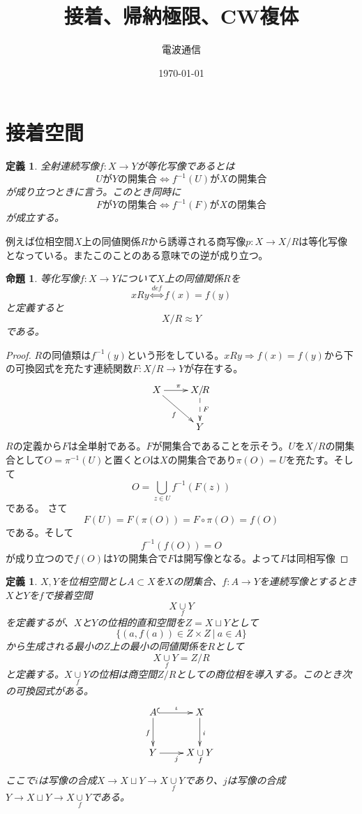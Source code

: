 \documentclass[leqno]{jsarticle}
\title{接着、帰納極限、CW複体}
\author{電波通信}
\date{\today}
\newtheorem{prop}[thm]{命題}
\newtheorem{df}[thm]{定義}
\newcommand{\To}{\Longrightarrow}
\newcommand{\qt}[2]{#1/\! #2}
\begin{document}
\maketitle
\section{接着空間}
\begin{df}
全射連続写像$f:X\to Y$が等化写像であるとは
\[
\mbox{$U$が$Y$の開集合}\iff\mbox{$f^{-1}(U)$が$X$の開集合}
\]
が成り立つときに言う。このとき同時に
\[
\mbox{$F$が$Y$の閉集合}\iff\mbox{$f^{-1}(F)$が$X$の閉集合}
\]
が成立する。
\end{df}
例えば位相空間$X$上の同値関係$R$から誘導される商写像$p:X\to \qt{X}{R}$は等化写像となっている。またこのことのある意味での逆が成り立つ。
\begin{prop}\label{syo}
等化写像$f:X\to Y$について$X$上の同値関係$R$を
\[
xRy\overset{def}{\iff}f(x)=f(y)
\]
と定義すると
\[
\qt{X}{R}\approx Y
\]
である。
\end{prop}
\begin{proof}$R$の同値類は$f^{-1}(y)$という形をしている。$xRy\To f(x)=f(y)$から下の可換図式を充たす連続関数$F:\qt{X}{R}\to Y$が存在する。
\[\xymatrix{
& X\ar@{->}[r]^{\pi} \ar@{->}[rd]_f& \qt{X}{R}\ar@{-->}[d]^F&\\ 
&  & Y&
}\]
$R$の定義から$F$は全単射である。$F$が開集合であることを示そう。$U$を$\qt{X}{R}$の開集合として$O=\pi^{-1}(U)$と置くと$O$は$X$の開集合であり$\pi(O)=U$を充たす。そして
\[
O=\bigcup_{z\in U}f^{-1}(F(z))
\]である。
さて
\[
F(U)=F(\pi(O))=F\circ \pi(O)=f(O)
\]
である。そして
\[
f^{-1}(f(O))=O
\]
が成り立つので$f(O)$は$Y$の開集合で$F$は開写像となる。よって$F$は同相写像
\end{proof}
\begin{df}
$X,Y$を位相空間とし$A\subset X$を$X$の閉集合、$f:A\to Y$を連続写像とするとき$X$と$Y$を$f$で接着空間
\[
X\underset{f}{\cup} Y
\]
を定義するが、$X$と$Y$の位相的直和空間を$Z=X\sqcup Y$として
\[
\{(a,f(a))\in Z\times Z\ |\ a\in A\}
\]
から生成される最小の$Z$上の最小の同値関係を$R$として
\[
X\underset{f}{\cup} Y=\qt{Z}{R}
\]
と定義する。$X\underset{f}{\cup} Y$の位相は商空間$\qt{Z}{R}$としての商位相を導入する。このとき次の可換図式がある。
\[\xymatrix{
& A \ar@{^{(}->}[r]^{\iota}\ar@{->}[d]_f& X \ar@{->}[d]^{i}&\\ 
& Y \ar@{->}[r]_{j}& X\underset{f}{\cup} Y &
}\]
ここで$i$は写像の合成$X\to X\sqcup Y\to X\underset{f}{\cup} Y$であり、$j$は写像の合成$Y\to X\sqcup Y\to X\underset{f}{\cup} Y$である。
\end{df}
\end{document}
